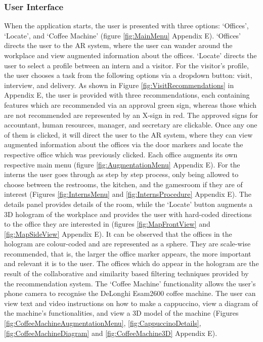 \documentclass{aifyp}
\begin{document}
\subsubsection{User Interface}
When the application starts, the user is presented with three options: ‘Offices’, ‘Locate’, and ‘Coffee Machine’ (figure \ref{fig:MainMenu} Appendix E). ‘Offices’ directs the user to the AR system, where the user can wander around the workplace and view augmented information about the offices. ‘Locate’ directs the user to select a profile between an intern and a visitor. For the visitor’s profile, the user chooses a task from the following options via a dropdown button: visit, interview, and delivery. As shown in Figure \ref{fig:VisitRecommendations} in Appendix E, the user is provided with three recommendations, each containing features which are recommended via an approval green sign, whereas those which are not recommended are represented by an X-sign in red. The approved signs for accountant, human resources, manager, and secretary are clickable. Once any one of them is clicked, it will direct the user to the AR system, where they can view augmented information about the offices via the door markers and locate the respective office which was previously clicked. Each office augments its own respective main menu (figure \ref{fig:AugmentationMenu} Appendix E). For the interns the user goes through as step by step process, only being allowed to choose between the restrooms, the kitchen, and the gamesroom if they are of interest (Figures \ref{fig:InternsMenu} and \ref{fig:InternsProcedure} Appendix E). 
\newline
\newline
The details panel provides details of the room, while the ‘Locate’ button augments a 3D hologram of the workplace and provides the user with hard-coded directions to the office they are interested in (figures \ref{fig:MapFrontView} and \ref{fig:MapSideView} Appendix E). It can be observed that the offices in the hologram are colour-coded and are represented as a sphere. They are scale-wise recommended, that is, the larger the office marker appears, the more important and relevant it is to the user. The offices which do appear in the hologram are the result of the collaborative and similarity based filtering techniques provided by the recommendation system.
\newline
\newline
The ‘Coffee Machine’ functionality allows the user’s phone camera to recognise the DeLonghi Esam2600 coffee machine. The user can view text and video instructions on how to make a cappuccino, view a diagram of the machine’s functionalities, and view a 3D model of the machine (Figures \ref{fig:CoffeeMachineAugmentationMenu}, \ref{fig:CappuccinoDetails}, \ref{fig:CoffeeMachineDiagram} and \ref{fig:CoffeeMachine3D} Appendix E).
\end{document}
